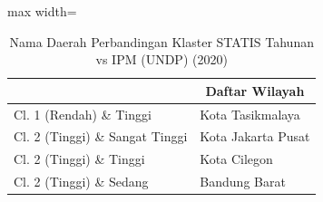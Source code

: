 \begin{table}[H]
\centering
\caption{Nama Daerah Perbandingan Klaster STATIS Tahunan vs IPM (UNDP) (2020)} \label{tab:sample1statis_ipm_name_2020}
\begin{adjustbox}{max width=\textwidth}
\begin{tabular}{|>{\centering\arraybackslash}p{4cm}|p{10cm}|}
\hline
\multicolumn{1}{|c|}{\textbf{Kategori}} & \multicolumn{1}{c|}{\textbf{Daftar Wilayah}} \\
\hline
Cl. 1 (Rendah) \& Tinggi & Kota Tasikmalaya \\
\hline
Cl. 2 (Tinggi) \& Sangat Tinggi & Kota Jakarta Pusat \\
\hline
Cl. 2 (Tinggi) \& Tinggi & Kota Cilegon \\
\hline
Cl. 2 (Tinggi) \& Sedang & Bandung Barat \\
\hline
\end{tabular}
\end{adjustbox}
\end{table}